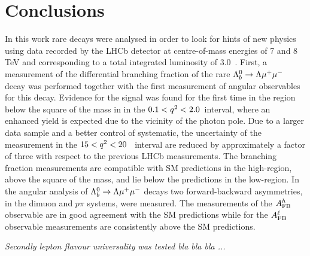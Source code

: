 \chapter{Conclusions}

In this work rare decays were analysed in order to look for hints of new physics using data recorded by the LHCb 
detector at centre-of-mass energies of 7 and 8 TeV and corresponding to a total integrated luminosity of 3.0~\invfb.
First, a measurement of the differential branching fraction of the rare $\Lambda^0_b\rightarrow\Lambda\mu^+\mu^-$ decay was performed together
with the first measurement of angular observables for this decay.
Evidence for the signal was found for the first time in the \qsq region below the square of the \jpsi mass in
in the $0.1 < q^2 < 2.0$~\gevgevcccc interval, where an enhanced yield is expected due to the vicinity of the photon pole. 
Due to a larger data sample and a better control of systematic, the uncertainty of the measurement in the $15 < q^2 < 20$~\gevgevcccc
interval are reduced by approximately a factor of three with respect to the previous LHCb measurements. 
The branching fraction measurements are compatible with SM predictions in the high-\qsq region, above the square
 of the \jpsi mass, and lie below the predictions in the low-\qsq region. In the angular analysis of $\Lambda^0_b\rightarrow\Lambda\mu^+\mu^-$ decays
 two forward-backward asymmetries, in the dimuon and $p\pi$ systems, were measured. The measurements
 of the $A_{\rm FB}^h$ observable are in good agreement with the SM predictions while for the $A_{\rm FB}^\ell$ observable
 measurements are consistently above the SM predictions.
 
 {\em Secondly lepton flavour universality was tested bla bla bla ...}